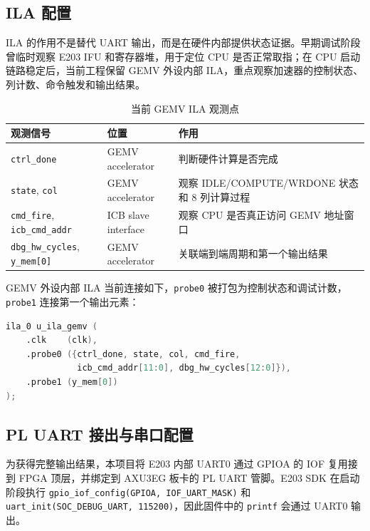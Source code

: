 \documentclass[12pt, a4paper]{article}
\begin{document}
\subsection{ILA 配置}

ILA 的作用不是替代 UART 输出，而是在硬件内部提供状态证据。早期调试阶段曾临时观察 E203 IFU 和寄存器堆，用于定位 CPU 是否正常取指；在 CPU 启动链路稳定后，当前工程保留 GEMV 外设内部 ILA，重点观察加速器的控制状态、列计数、命令触发和输出结果。

\begin{table}[H]
    \centering
    \caption{当前 GEMV ILA 观测点}
    \label{tab:ila}
    \begin{tabular}{p{3.7cm}p{3.4cm}p{6.2cm}}
        \toprule
        \textbf{观测信号} & \textbf{位置} & \textbf{作用} \\
        \midrule
        \texttt{ctrl\_done} & GEMV accelerator & 判断硬件计算是否完成 \\
        \texttt{state}, \texttt{col} & GEMV accelerator & 观察 IDLE/COMPUTE/WRDONE 状态和 8 列计算过程 \\
        \texttt{cmd\_fire}, \texttt{icb\_cmd\_addr} & ICB slave interface & 观察 CPU 是否真正访问 GEMV 地址窗口 \\
        \texttt{dbg\_hw\_cycles}, \texttt{y\_mem[0]} & GEMV accelerator & 关联端到端周期和第一个输出结果 \\
        \bottomrule
    \end{tabular}
\end{table}

GEMV 外设内部 ILA 当前连接如下，\texttt{probe0} 被打包为控制状态和调试计数，\texttt{probe1} 连接第一个输出元素：

\begin{lstlisting}[language=Verilog,caption={GEMV 外设 ILA probe}]
ila_0 u_ila_gemv (
    .clk    (clk),
    .probe0 ({ctrl_done, state, col, cmd_fire,
              icb_cmd_addr[11:0], dbg_hw_cycles[12:0]}),
    .probe1 (y_mem[0])
);
\end{lstlisting}

\subsection{PL UART 接出与串口配置}

为获得完整输出结果，本项目将 E203 内部 UART0 通过 GPIOA 的 IOF 复用接到 FPGA 顶层，并绑定到 AXU3EG 板卡的 PL UART 管脚。E203 SDK 在启动阶段执行 \texttt{gpio\_iof\_config(GPIOA, IOF\_UART\_MASK)} 和 \texttt{uart\_init(SOC\_DEBUG\_UART, 115200)}，因此固件中的 \texttt{printf} 会通过 UART0 输出。
\end{document}

